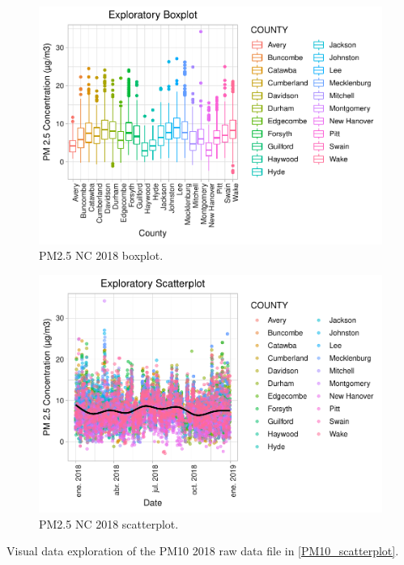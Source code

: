 \documentclass[12pt,]{article}
\begin{document}
\begin{figure}
\centering
\includegraphics{Raby_ENV872_Project_files/figure-latex/unnamed-chunk-12-1.pdf}
\caption{PM2.5 NC 2018 boxplot. \label{PM2.5_boxplot}}
\end{figure}

\newpage

\begin{figure}
\centering
\includegraphics{Raby_ENV872_Project_files/figure-latex/unnamed-chunk-13-1.pdf}
\caption{PM2.5 NC 2018 scatterplot. \label{PM2.5_scatterplot}}
\end{figure}

\newpage

Visual data exploration of the PM10 2018 raw data file in
\autoref{PM10_scatterplot}.
\end{document}
